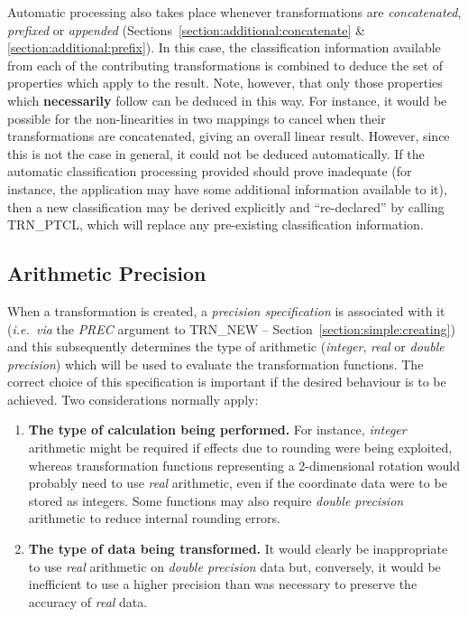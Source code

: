 \documentclass[twoside,nolof,11pt]{starlink}
\providecommand{\name}[1]{\small{#1}}
\providecommand{\fortvar}[1]{\emph{#1}}
\begin{document}
Automatic processing also takes place whenever transformations are
\emph{concatenated}, \emph{prefixed} or \emph{appended}
(Sections~\ref{section:additional:concatenate} \&
\ref{section:additional:prefix}).
In this case, the classification information available from each of the
contributing transformations is combined to deduce the set of
properties which apply to the result.
Note, however, that only those properties which \textbf{necessarily} follow can
be deduced in this way.
For instance, it would be possible for the non-linearities in two mappings
to cancel when their transformations are concatenated, giving an overall
linear result.
However, since this is not the case in general, it could not be deduced
automatically.
If the automatic classification processing provided should prove inadequate
(for instance, the application may have some additional information
available to it), then a new classification may be derived explicitly and
``re-declared'' by calling \name{TRN\_PTCL}, which will replace any
pre-existing classification information.


\subsection{Arithmetic Precision}

\label{section:advanced:precision}

When a transformation is created, a \emph{precision specification} is
associated with it (\emph{i.e.\ via} the \fortvar{PREC} argument to
\name{TRN\_NEW} -- Section~\ref{section:simple:creating}) and this
subsequently determines the type of arithmetic (\emph{integer}, \emph{real} or
\emph{double precision}) which will be used to evaluate the transformation
functions.
The correct choice of this specification is important if the desired
behaviour is to be achieved.
Two considerations normally apply:

\begin{enumerate}

\item \textbf{The type of calculation being performed.}
For instance, \emph{integer} arithmetic might be required if effects due to
rounding were being exploited, whereas transformation functions representing
a 2-dimensional rotation would probably need to use \emph{real} arithmetic,
even if the coordinate data were to be stored as integers.
Some functions may also require \emph{double precision} arithmetic to reduce
internal rounding errors.

\item \textbf{The type of data being transformed.}
It would clearly be inappropriate to use \emph{real} arithmetic on \emph{double precision} data but, conversely, it would be inefficient to use a
higher precision than was necessary to preserve the accuracy of \emph{real}
data.

\end{enumerate}
\end{document}
